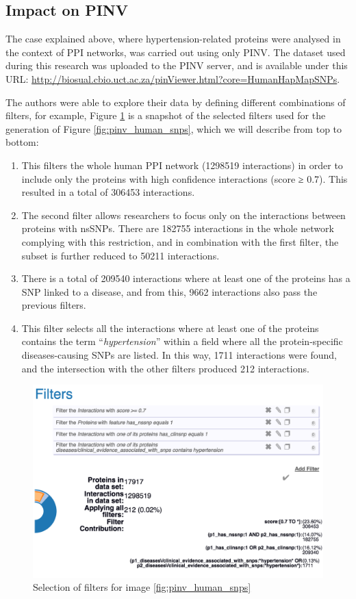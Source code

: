 \subsection{Impact on PINV}
The case explained above, where hypertension-related proteins were analysed in the context of PPI networks, was carried out using only PINV. The dataset used during this research was uploaded to the PINV server, and is available under this URL: \url{http://biosual.cbio.uct.ac.za/pinViewer.html?core=HumanHapMapSNPs}. 

The authors were able to explore their data by defining different combinations of filters, for example, Figure \ref{fig:pinv_prefilters_snp} is a snapshot of the selected filters used for the generation of Figure \ref{fig:pinv_human_snps}, which we will describe from top to bottom: 
\begin{enumerate}
\setlength\itemsep{-0.5em}
\item This filters the whole human PPI network (1298519 interactions) in order to include only the proteins with high confidence interactions (score ≥ 0.7). This resulted in a total of 306453 interactions.
\item The second filter allows researchers to focus only on the interactions between proteins with nsSNPs. There are 182755 interactions in the whole network complying with this restriction, and in combination with the first filter, the subset is further reduced to 50211 interactions.
\item There is a total of 209540 interactions where at least one of the proteins has a SNP linked to a disease, and from this, 9662 interactions also pass the previous filters.
\item This filter selects all the interactions where at least one of the proteins contains the term ``\emph{hypertension}'' within a field where all the protein-specific diseases-causing SNPs are listed. In this way, 1711 interactions were found, and the intersection with the other filters produced 212 interactions.
\end{enumerate}

\begin{figure}
\centering
\includegraphics[width=5in]{figures/pinv_prefilters_snp.png}
\caption[Selection of filters for image \ref{fig:pinv_human_snps}]{Selection of filters for image \ref{fig:pinv_human_snps}
\label{fig:pinv_prefilters_snp}}
\end{figure}

